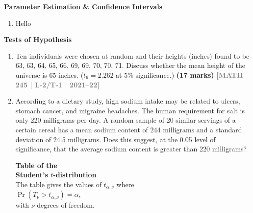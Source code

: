 \documentclass[12pt,a4paper]{article}
\newcommand{\yr}[1]{\hfill\textcolor{gray}{\small\textbf{[#1]}}}
\newcommand{\mk}[1]{\textcolor{orange!70!black}{\small\textbf{(#1 marks)}}}
\newcommand{\subtopic}[2]{%
  \vspace{10pt}
  \noindent\begin{tcolorbox}[colback=#1!8,colframe=#1,boxrule=0.6pt,arc=4pt,
    left=6pt,right=6pt,top=4pt,bottom=4pt]
    \small\bfseries\textcolor{#1}{#2}
  \end{tcolorbox}
  \vspace{2pt}
}
\begin{document}
\subtopic{cG}{Parameter Estimation \& Confidence Intervals}
\label{sub:s9-estimation}

\begin{enumerate}\item Hello \end{enumerate}

\subtopic{cG}{Tests of Hypothesis}
\label{sub:s9-hypothesis}

\begin{enumerate}\item Ten individuals were chosen at random and their heights (inches) found to be 63, 63, 64, 65, 66, 69, 69, 70, 70, 71. Discuss whether the mean height of the universe is 65 inches. ($t_{9}=2.262$ at 5\% significance.)
\mk{17} \yr{MATH 245 | L-2/T-1 | 2021--22}

\item According to a dietary study, high sodium intake may be related to ulcers, stomach cancer, and migraine headaches. The human requirement for salt is only 220 milligrams per day. A random sample of 20 similar servings of a certain cereal has a mean sodium content of 244 milligrams and a standard deviation of 24.5 milligrams. Does this suggest, at the 0.05 level of significance, that the average sodium content is greater than 220 milligrams?

\begin{center}
\begin{minipage}{0.45\textwidth}
    \centering
    \textbf{\large Table of the} \\
    \vspace{0.2cm}
    \textbf{\large Student's $t$-distribution} \\
    \vspace{0.4cm}
    The table gives the values of $t_{\alpha, \nu}$ where \\
    $\Pr(T_\nu > t_{\alpha, \nu}) = \alpha$, \\
    with $\nu$ degrees of freedom.
\end{minipage}
\hfill
\begin{minipage}{0.45\textwidth}
    \centering
\end{minipage}
\end{center}
\end{enumerate}
\end{document}
